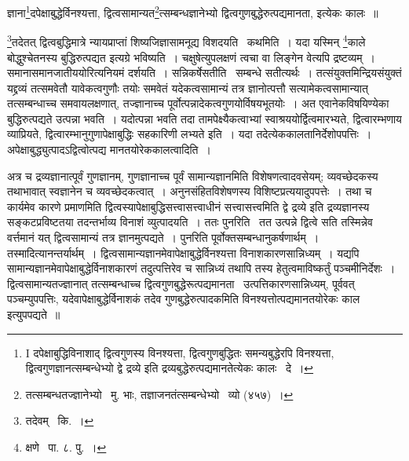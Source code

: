 \documentclass[11pt, openany]{book}
\begin{document}
{\newpage
\hspace{1.3cm} \hangindent=2cm {\knu ज्ञाना\renewcommand{\thefootnote}{1}\footnote{I दपेक्षाबुद्धिविनाशाद् द्वित्वगुणस्य विनश्यत्ता, द्वित्वगुणबुद्धितः समन्यबुद्धेरपि विनश्यत्ता, द्वित्वगुणज्ञानत्सम्बन्धेभ्यो द्वे द्रव्ये इति द्रव्यबुद्धेरुत्पद्यमानतेत्येकः कालः \textendash\ दे~।}दपेक्षाबुद्धेर्विनश्यत्ता, द्वित्वसामान्यत\renewcommand{\thefootnote}{2}\footnote{तत्सम्बन्धतज्ज्ञानेभ्यो \textendash\ मु. भाः, तज्ञाजनतंत्सम्बन्धेभ्यो \textendash\ व्यो (४५७)~।}त्सम्बन्धज्ञानेभ्यो द्वित्वगुणबुद्धेरुत्पद्यमानता, इत्येकः कालः~॥}

\renewcommand{\thefootnote}{3}\footnote{तदेवम् \textendash\ कि.~।}तदेतत् द्वित्वबुद्धिमात्रे न्यायप्राप्तां शिष्यजिज्ञासामनूद्य विशदयति \textendash\ {\knu कथमिति~।} यदा यस्मिन् \renewcommand{\thefootnote}{4}\footnote{क्षणे \textendash\ पा. ८. पु.~।}काले बोद्धुश्चेतनस्य बुद्धिरुत्पद्यत इत्यग्रे भविष्यति~। चक्षुषेत्युपलक्षणं त्वचा वा लिङ्गेन वेत्यपि द्रष्टव्यम्~। {\knu समानासमानजातीययो}रित्यनियमं दर्शयति~। {\knu सन्निकर्षेसतीति} \textendash\ सम्बन्धे सतीत्यर्थः~। तत्संयुक्तमिन्द्रियसंयुक्तं यद्द्रव्यं तत्समवेतौ यावेकत्वगुणौः तयोः समवेतं यदेकत्वसामान्यं तत्र ज्ञानोत्पत्तौ सत्यामेकत्वसामान्यात् तत्सम्बन्धाच्च समवायलक्षणात्, तज्ज्ञानाच्च पूर्वोत्पन्नादेकत्वगुणयोर्विषयभूतयोः~। अत एवानेकविषयिण्येका बुद्धिरुत्पद्यते उत्पन्ना भवति~। यदोत्पन्ना भवति तदा तामपेक्ष्यैकत्वाभ्यां स्वाश्रययोर्द्वित्वमारभ्यते, द्वित्वारम्भणाय व्याप्रियते, द्वित्वारम्भानुगुणापेक्षाबुद्धिः सहकारिणी लभ्यते इति~। यदा तदेत्येककालतानिर्देशोपपत्तिः~। अपेक्षाबुद्ध्युत्पादऽद्वित्वोत्पद्य मानतयोरेककालत्वादिति~।

अत्र च द्रव्यज्ञानात्पूर्वं गुणज्ञानम्, गुणज्ञानाच्च पूर्वं सामान्यज्ञानमिति विशेषणत्वादवसेयम्; व्यवच्छेदकस्य तथाभावात् स्वज्ञानेन च व्यवच्छेदकत्वात्~। अनुनसंहितविशेषणस्य विशिष्टप्रत्ययादुपपत्तेः~। तथा च कार्यमेव कारणे प्रमाणमिति द्वित्वस्यापेक्षाबुद्धिसत्त्वासत्त्वाधीनं सत्त्वासत्त्वमिति द्वे द्रव्ये इति द्रव्यज्ञानस्य सङ्कटप्रविष्टतया तदन्तर्भाव्य विनाशं व्युत्पादयति~। {\knu ततः पुनरिति} \textendash\ तत उत्पन्ने द्वित्वे सति तस्मिन्नेव वर्त्तमानं यत् द्वित्वसामान्यं तत्र ज्ञानमुत्पद्यते~। पुनरिति पूर्वोक्तसम्बन्धानुकर्षणार्थम्~। तस्मादित्यानन्तर्यार्थम्~। द्वित्वसामान्यज्ञानमेवापेक्षाबुद्धेर्विनश्यत्ता विनाशकारणसान्निध्यम्~। यद्यपि सामान्यज्ञानमेवापेक्षाबुद्धेर्विनाशकारणं तदुत्पत्तिरेव च सान्निध्यं तथापि तस्य हेतुत्वमाविष्कर्तुं पञ्चमीनिर्देशः~। द्वित्वसामान्यतज्ज्ञानात् तत्सम्बन्धाच्च द्वित्वगुणबुद्धेरूत्पद्यमानता \textendash\ उत्पत्तिकारणसान्निध्यम्, पूर्ववत् पञ्चम्युपपत्तिः, यदेवापेक्षाबुद्धेर्विनाशकं तदेव गुणबुद्धेरुत्पादकमिति विनश्यत्तोत्पद्यमानतयोरेकः काल इत्युपपद्यते~॥

}
\end{document}
